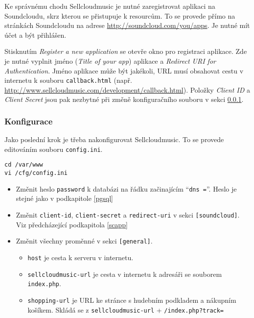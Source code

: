 \documentclass[12pt]{article}
\begin{document}
Ke správnému chodu Sellcloudmusic je nutné zaregistrovat aplikaci na Soundcloudu, skrz kterou se přistupuje k resourcům. To se provede přímo na stránkách Soundcloudu na adrese \url{http://soundcloud.com/you/apps}. Je nutné mít účet a být přihlášen.

Stisknutím \emph{Register a new application} se otevře okno pro registraci aplikace. Zde je nutné vyplnit jméno (\emph{Title of your app}) aplikace  a \emph{Redirect URI for Authentication}. Jméno aplikace může být jakékoli, URL musí obsahovat cestu v internetu k souboru \texttt{callback.html} (např. \url{http://www.sellcloudmusic.com/development/callback.html}).
Položky \emph{Client ID} a \emph{Client Secret} jsou pak nezbytné při změně konfiguračního souboru v sekci \ref{scmconf}.

\subsubsection{Konfigurace} \label{scmconf}

Jako poslední krok je třeba nakonfigurovat Sellcloudmusic. To se provede editováním souboru \texttt{config.ini}.\newline

\begin{lstlisting}
cd /var/www
vi /cfg/config.ini
\end{lstlisting}

\begin{itemize}
\item Změnit heslo \texttt{password} k databázi na řádku začinajícím ``\texttt{dns =}''. Heslo je stejné jako v podkapitole \ref{pgsql}
\item Změnit \texttt{client-id}, \texttt{client-secret} a \texttt{redirect-uri} v sekci \texttt{[soundcloud]}. Viz předcházející podkapitola \ref{scapp}
\item Změnit všechny proměnné v sekci \texttt{[general]}.
  \begin{itemize}
  \item \texttt{host} je cesta k serveru v internetu.
  \item \texttt{sellcloudmusic-url} je cesta v internetu k adresáři se souborem \texttt{index.php}.
  \item \texttt{shopping-url} je URL ke stránce s hudebním podkladem a nákupním košíkem. Skládá se z \texttt{sellcloudmusic-url} + \texttt{/index.php?track=}
  \end{itemize}
\end{itemize}
\end{document}
